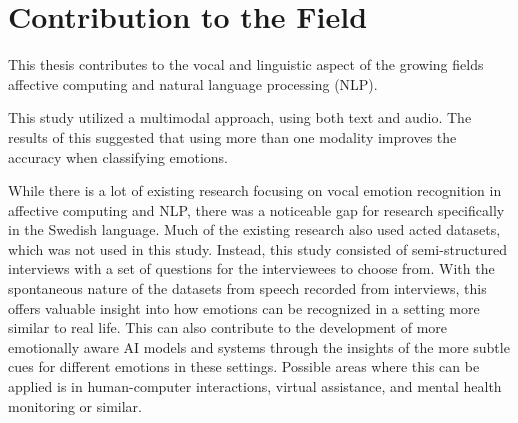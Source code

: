 \section{Contribution to the Field}
\label{sec:con-contribution}
This thesis contributes to the vocal and linguistic aspect of the growing fields affective computing and natural language processing (NLP).

This study utilized a multimodal approach, using both text and audio. The results of this suggested that using more than one modality improves the accuracy when classifying emotions.

While there is a lot of existing research focusing on vocal emotion recognition in affective computing and NLP, there was a noticeable gap for research specifically in the Swedish language. 
Much of the existing research also used acted datasets, which was not used in this study. Instead, this study consisted of semi-structured interviews with a set of questions for the interviewees to choose from. With the spontaneous nature of the datasets from speech recorded from interviews, this offers valuable insight into how emotions can be recognized in a setting more similar to real life. This can also contribute to the development of more emotionally aware AI models and systems through the insights of the more subtle cues for different emotions in these settings. Possible areas where this can be applied is in human-computer interactions, virtual assistance, and mental health monitoring or similar.
